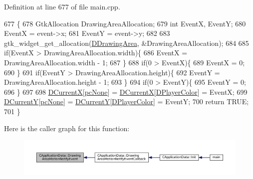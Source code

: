 Definition at line 677 of file main.\+cpp.


\begin{DoxyCode}
677                                                                                                \{
678     GtkAllocation DrawingAreaAllocation;
679     \textcolor{keywordtype}{int} EventX, EventY;
680     EventX = \textcolor{keyword}{event}->x;
681     EventY = \textcolor{keyword}{event}->y;
682 
683     gtk\_widget\_get\_allocation(\hyperlink{classCApplicationData_a4735f5d31632313e0b2a1659eb178987}{DDrawingArea}, &DrawingAreaAllocation);
684     
685     \textcolor{keywordflow}{if}(EventX > DrawingAreaAllocation.width)\{
686         EventX = DrawingAreaAllocation.width - 1;
687     \}
688     \textcolor{keywordflow}{if}(0 > EventX)\{
689         EventX = 0;   
690     \}
691     \textcolor{keywordflow}{if}(EventY > DrawingAreaAllocation.height)\{
692         EventY = DrawingAreaAllocation.height - 1;
693     \}
694     \textcolor{keywordflow}{if}(0 > EventY)\{
695         EventY = 0;   
696     \}
697 
698     \hyperlink{classCApplicationData_a1dc7ee482a39f7978c71365ac540f97a}{DCurrentX}[\hyperlink{GameDataTypes_8h_aafb0ca75933357ff28a6d7efbdd7602fa88767aa8e02c7b3192bbab4127b3d729}{pcNone}] = \hyperlink{classCApplicationData_a1dc7ee482a39f7978c71365ac540f97a}{DCurrentX}[\hyperlink{classCApplicationData_a53550939b20cba70570f113e4d1c5d02}{DPlayerColor}] = EventX;
699     \hyperlink{classCApplicationData_a0ba39779ae11c8072258c6ddfebd6052}{DCurrentY}[\hyperlink{GameDataTypes_8h_aafb0ca75933357ff28a6d7efbdd7602fa88767aa8e02c7b3192bbab4127b3d729}{pcNone}] = \hyperlink{classCApplicationData_a0ba39779ae11c8072258c6ddfebd6052}{DCurrentY}[\hyperlink{classCApplicationData_a53550939b20cba70570f113e4d1c5d02}{DPlayerColor}] = EventY;
700     \textcolor{keywordflow}{return} TRUE;
701 \}
\end{DoxyCode}
Here is the caller graph for this function\+:
\nopagebreak
\begin{figure}[H]
\begin{center}
\leavevmode
\includegraphics[width=350pt]{classCApplicationData_a9b53201c01b399df18b02d1e93213e45_icgraph}
\end{center}
\end{figure}
\hypertarget{classCApplicationData_a463a4bc8eabe67f9f22c46d96f5eff88}{}\label{classCApplicationData_a463a4bc8eabe67f9f22c46d96f5eff88} 
